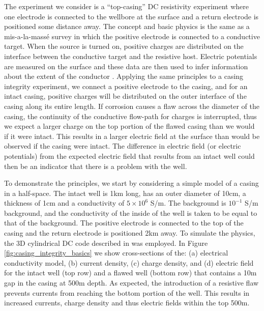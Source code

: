 The experiment we consider is a ``top-casing'' DC resistivity experiment where one electrode is connected to the wellbore at the surface and a return electrode is positioned some distance away. The concept and basic physics is the same as a mis-a-la-mass\'e survey in which the positive electrode is connected to a conductive target. When the source is turned on, positive charges are distributed on the interface between the conductive target and the resistive host. Electric potentials are measured on the surface and these data are then used to infer information about the extent of the conductor \citep{Telford1990}. Applying the same principles to a casing integrity experiment, we connect a positive electrode to the casing, and for an intact casing, positive charges will be distributed on the outer interface of the casing along its entire length. If corrosion causes a flaw across the diameter of the casing, the continuity of the conductive flow-path for charges is interrupted, thus we expect a larger charge on the top portion of the flawed casing than we would if it were intact. This results in a larger electric field at the surface than would be observed if the casing were intact. The difference in electric field (or electric potentials) from the expected electric field that results from an intact well could then be an indicator that there is a problem with the well.

To demonstrate the principles, we start by considering a simple model of a casing in a half-space. The intact well is 1km long, has an outer diameter of 10cm, a thickness of 1cm and a conductivity of $5\times10^6$ S/m. The background is $10^{-1}$ S/m background, and the conductivity of the inside of the well is taken to be equal to that of the background. The positive electrode is connected to the top of the casing and the return electrode is positioned 2km away. To simulate the physics, the 3D cylindrical DC code described in \cite{Heagy2018a} was employed. In Figure \ref{fig:casing_integrity_basics} we show cross-sections of the: (a) electrical conductivity model, (b) current density, (c) charge density, and (d) electric field for the intact well (top row)  and a flawed well (bottom row) that contains a 10m gap in the casing at 500m depth. As expected, the introduction of a resistive flaw prevents currents from reaching the bottom portion of the well. This results in increased currents, charge density and thus electric fields within the top 500m.


